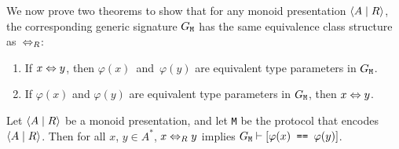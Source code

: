 \documentclass[../generics]{subfiles}
\begin{document}
We now prove two theorems to show that for any monoid presentation $\langle A \mid R\rangle$, the corresponding generic signature $G_\texttt{M}$ has the same equivalence class structure as~$\Leftrightarrow_R$:
\begin{enumerate}
\item If $x\Leftrightarrow y$, then $\varphi(x)$~and~$\varphi(y)$ are equivalent type parameters in $G_\texttt{M}$.
\item If $\varphi(x)$ and $\varphi(y)$ are equivalent type parameters in $G_\texttt{M}$, then $x\Leftrightarrow y$.
\end{enumerate}

\begin{theorem}\label{path to derivation}
Let $\langle A \mid R\rangle$ be a monoid presentation, and let \texttt{M} be the protocol that encodes $\langle A \mid R\rangle$. Then for all $x$, $y\in A^*$, $x\Leftrightarrow_R y$ implies $G_\texttt{M}\vdash[\texttt{$\varphi(x)$ == $\varphi(y)$}]$.
\end{theorem}
\end{document}
